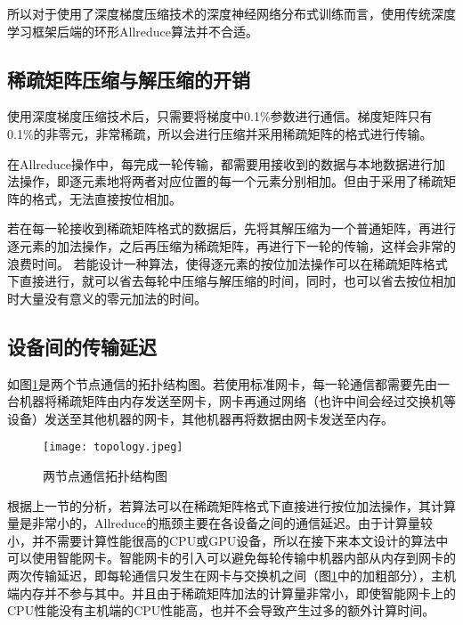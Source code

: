   所以对于使用了深度梯度压缩技术的深度神经网络分布式训练而言，使用传统深度学习框架后端的环形Allreduce算法并不合适。

\subsection{稀疏矩阵压缩与解压缩的开销}
使用深度梯度压缩技术后，只需要将梯度中0.1\%参数进行通信。梯度矩阵只有0.1\%的非零元，非常稀疏，所以会进行压缩并采用稀疏矩阵的格式进行传输。

在Allreduce操作中，每完成一轮传输，都需要用接收到的数据与本地数据进行加法操作，即逐元素地将两者对应位置的每一个元素分别相加。但由于采用了稀疏矩阵的格式，无法直接按位相加。

若在每一轮接收到稀疏矩阵格式的数据后，先将其解压缩为一个普通矩阵，再进行逐元素的加法操作，之后再压缩为稀疏矩阵，再进行下一轮的传输，这样会非常的浪费时间。
若能设计一种算法，使得逐元素的按位加法操作可以在稀疏矩阵格式下直接进行，就可以省去每轮中压缩与解压缩的时间，同时，也可以省去按位相加时大量没有意义的零元加法的时间。

\subsection{设备间的传输延迟}
如图\ref{fig:topology}是两个节点通信的拓扑结构图。若使用标准网卡，每一轮通信都需要先由一台机器将稀疏矩阵由内存发送至网卡，网卡再通过网络（也许中间会经过交换机等设备）发送至其他机器的网卡，其他机器再将数据由网卡发送至内存。

\begin{figure}[ht] %
  \centering
  \texttt{[image: topology.jpeg]}
  \caption{两节点通信拓扑结构图}
  \label{fig:topology}
\end{figure}

根据上一节的分析，若算法可以在稀疏矩阵格式下直接进行按位加法操作，其计算量是非常小的，Allreduce的瓶颈主要在各设备之间的通信延迟。由于计算量较小，并不需要计算性能很高的CPU或GPU设备，所以在接下来本文设计的算法中可以使用智能网卡。智能网卡的引入可以避免每轮传输中机器内部从内存到网卡的两次传输延迟，即每轮通信只发生在网卡与交换机之间（图\ref{fig:topology}中的加粗部分），主机端内存并不参与其中。并且由于稀疏矩阵加法的计算量非常小，即使智能网卡上的CPU性能没有主机端的CPU性能高，也并不会导致产生过多的额外计算时间。

